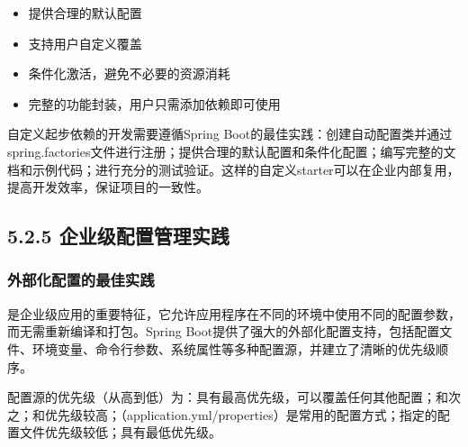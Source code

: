 \begin{enumerate}
  \begin{itemize}
  \tightlist
  \item
    提供合理的默认配置
  \item
    支持用户自定义覆盖
  \item
    条件化激活，避免不必要的资源消耗
  \item
    完整的功能封装，用户只需添加依赖即可使用
  \end{itemize}
\end{enumerate}

自定义起步依赖的开发需要遵循Spring Boot的最佳实践：创建自动配置类并通过spring.factories文件进行注册；提供合理的默认配置和条件化配置；编写完整的文档和示例代码；进行充分的测试验证。这样的自定义starter可以在企业内部复用，提高开发效率，保证项目的一致性。

\hypertarget{ux4f01ux4e1aux7ea7ux914dux7f6eux7ba1ux7406ux5b9eux8df5}{%
\subsection{5.2.5 企业级配置管理实践}\label{ux4f01ux4e1aux7ea7ux914dux7f6eux7ba1ux7406ux5b9eux8df5}}

\hypertarget{ux5916ux90e8ux5316ux914dux7f6eux7684ux6700ux4f73ux5b9eux8df5}{%
\subsubsection{外部化配置的最佳实践}\label{ux5916ux90e8ux5316ux914dux7f6eux7684ux6700ux4f73ux5b9eux8df5}}

是企业级应用的重要特征，它允许应用程序在不同的环境中使用不同的配置参数，而无需重新编译和打包。Spring Boot提供了强大的外部化配置支持，包括配置文件、环境变量、命令行参数、系统属性等多种配置源，并建立了清晰的优先级顺序。

配置源的优先级（从高到低）为：具有最高优先级，可以覆盖任何其他配置；和次之；和优先级较高；（application.yml/properties）是常用的配置方式；指定的配置文件优先级较低；具有最低优先级。

